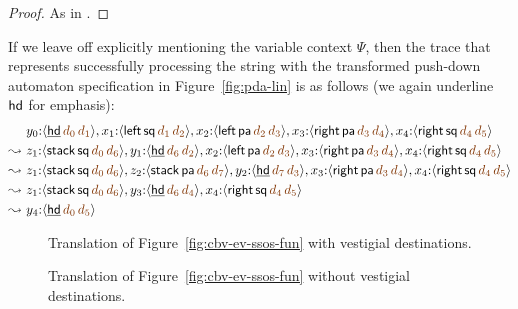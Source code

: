\begin{proof}
As in \cite[Theorem 2]{simmons11logical}.
\end{proof}


If we leave off explicitly mentioning the variable context $\Psi$, 
then the trace that represents successfully processing 
the string {\sf [ ( ) ] }
with the transformed push-down automaton 
specification in Figure~\ref{fig:pda-lin} 
is as follows (we again underline ${\sf hd}$
for emphasis):
\begin{align*}
           & y_0{:}\susp{\underline{\sf hd}\,\lf{d_0}\,\lf{d_1}},
             x_1{:}\susp{{\sf left}\,{\sf sq}\,\lf{d_1}\,\lf{d_2}},
             x_2{:}\susp{{\sf left}\,{\sf pa}\,\lf{d_2}\,\lf{d_3}},
             x_3{:}\susp{{\sf right}\,{\sf pa}\,\lf{d_3}\,\lf{d_4}},
             x_4{:}\susp{{\sf right}\,{\sf sq}\,\lf{d_4}\,\lf{d_5}}
\\
\leadsto ~ & z_1{:}\susp{{\sf stack}\,{\sf sq}\,\lf{d_0}\,\lf{d_6}},
             y_1{:}\susp{\underline{\sf hd}\,\lf{d_6}\,\lf{d_2}},
             x_2{:}\susp{{\sf left}\,{\sf pa}\,\lf{d_2}\,\lf{d_3}},
             x_3{:}\susp{{\sf right}\,{\sf pa}\,\lf{d_3}\,\lf{d_4}},
             x_4{:}\susp{{\sf right}\,{\sf sq}\,\lf{d_4}\,\lf{d_5}}
\\
\leadsto ~ & z_1{:}\susp{{\sf stack}\,{\sf sq}\,\lf{d_0}\,\lf{d_6}},
             z_2{:}\susp{{\sf stack}\,{\sf pa}\,\lf{d_6}\,\lf{d_7}},
             y_2{:}\susp{\underline{\sf hd}\,\lf{d_7}\,\lf{d_3}},
             x_3{:}\susp{{\sf right}\,{\sf pa}\,\lf{d_3}\,\lf{d_4}},
             x_4{:}\susp{{\sf right}\,{\sf sq}\,\lf{d_4}\,\lf{d_5}}
\\
\leadsto ~ & z_1{:}\susp{{\sf stack}\,{\sf sq}\,\lf{d_0}\,\lf{d_6}},
             y_3{:}\susp{\underline{\sf hd}\,\lf{d_6}\,\lf{d_4}},
             x_4{:}\susp{{\sf right}\,{\sf sq}\,\lf{d_4}\,\lf{d_5}}
\\
\leadsto ~ & y_4{:}\susp{\underline{\sf hd}\,\lf{d_0}\,\lf{d_5}}
\end{align*}


\begin{figure}[t]
\caption{Translation of Figure~\ref{fig:cbv-ev-ssos-fun} with vestigial destinations.}
\label{fig:dest-vestige}
\end{figure}

\begin{figure}
\caption{Translation of Figure~\ref{fig:cbv-ev-ssos-fun} without vestigial destinations.}
\label{fig:dest-cbv}
\end{figure}



